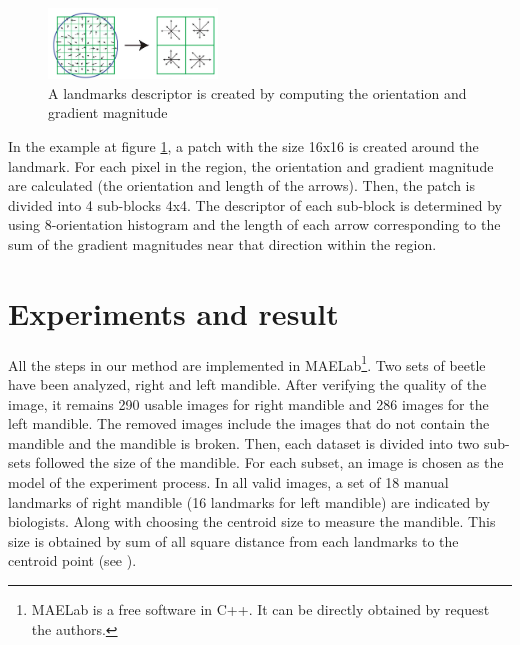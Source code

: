 \documentclass[twoside,twocolumn,10pt]{article}
\begin{document}
\begin{figure}[htb]
    \centering
    \includegraphics[width=0.4\textwidth]{./images/keypoint_descriptor}
    \caption{A landmarks descriptor is created by computing the orientation and gradient magnitude}
    \label{fig:kpdescriptor}
\end{figure}

In the example at figure \ref{fig:kpdescriptor}, a patch with the size 16x16 is created around the landmark. For each pixel in the region, the orientation and gradient magnitude are calculated (the orientation and length of the arrows). Then, the patch is divided into 4 sub-blocks 4x4. The descriptor of each sub-block is determined by using 8-orientation histogram and the length of each arrow corresponding to the sum of the gradient magnitudes near that direction within the region.\\

\section{Experiments and result}
All the steps in our method are implemented in MAELab\footnote{MAELab
  is a free software in C++. It can be directly obtained by request
  the authors.}. Two sets of beetle have been analyzed, right and left
mandible. After verifying the quality of the image, it remains 290
usable images for right mandible and 286 images for the left mandible. The
removed images include the images that do not contain the mandible and
the mandible is broken. Then, each dataset is divided into two sub-sets followed the size of the mandible. For each subset, an image is chosen as the model of the experiment process. In all valid images, a set of 18 manual landmarks of right mandible (16 landmarks for left mandible) are indicated by biologists. Along with choosing the centroid size to measure the mandible. This size is obtained by sum of all square distance from each landmarks to the
centroid point (see \cite{web2010}).\\
\end{document}
